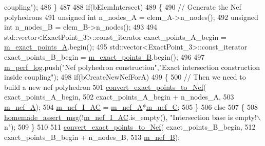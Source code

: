 \begin{DoxyCode}
{       coupling"});
486     \}
487 
488     \textcolor{keywordflow}{if}(bElemIntersect)
489     \{
490         \textcolor{comment}{// Generate the Nef polyhedrons}
491         \textcolor{keywordtype}{unsigned} \textcolor{keywordtype}{int} n\_nodes\_A = elem\_A->n\_nodes();
492         \textcolor{keywordtype}{unsigned} \textcolor{keywordtype}{int} n\_nodes\_B = elem\_B->n\_nodes();
493 
494         std::vector<ExactPoint\_3>::const\_iterator exact\_points\_A\_begin = 
      \hyperlink{classcarl_1_1_intersection___tools_ad636117b292272044b252be62124eb0a}{m\_exact\_points\_A}.begin();
495         std::vector<ExactPoint\_3>::const\_iterator exact\_points\_B\_begin = 
      \hyperlink{classcarl_1_1_intersection___tools_a2c3b6211dd1f9b0aa5f2ac8ffc383182}{m\_exact\_points\_B}.begin();
496 
497         \hyperlink{classcarl_1_1_intersection___tools_afe18e6ca5fd12bae08efb98f69c71a48}{m\_perf\_log}.push(\textcolor{stringliteral}{"Nef polyhedron construction"},\textcolor{stringliteral}{"Exact intersection construction inside
       coupling"});
498         \textcolor{keywordflow}{if}(bCreateNewNefForA)
499         \{
500             \textcolor{comment}{// Then we need to build a new nef polyhedron}
501             \hyperlink{classcarl_1_1_intersection___tools_af689c53cf00359c518234d8d070c4e53}{convert\_exact\_points\_to\_Nef}( exact\_points\_A\_begin,
502                                             exact\_points\_A\_begin + n\_nodes\_A,
503                                             \hyperlink{classcarl_1_1_intersection___tools_a66a33158af0779366d4109e96a10ddc4}{m\_nef\_A});
504             \hyperlink{classcarl_1_1_intersection___tools_a8333f16787459e65c4fe913dad50b5c6}{m\_nef\_I\_AC} = \hyperlink{classcarl_1_1_intersection___tools_a66a33158af0779366d4109e96a10ddc4}{m\_nef\_A}*\hyperlink{classcarl_1_1_intersection___tools_adf2892a8902442fbfebb913e9a4fb8ac}{m\_nef\_C};
505         \}
506         \textcolor{keywordflow}{else}
507         \{
508             \hyperlink{common__header_8h_a593ccc80b790b2268653fcf6597bf451}{homemade\_assert\_msg}(!\hyperlink{classcarl_1_1_intersection___tools_a8333f16787459e65c4fe913dad50b5c6}{m\_nef\_I\_AC}.is\_empty(), \textcolor{stringliteral}{"Intersection base is
       empty!\(\backslash\)n"});
509         \}
510 
511         \hyperlink{classcarl_1_1_intersection___tools_af689c53cf00359c518234d8d070c4e53}{convert\_exact\_points\_to\_Nef}( exact\_points\_B\_begin,
512                                         exact\_points\_B\_begin + n\_nodes\_B,
513                                         \hyperlink{classcarl_1_1_intersection___tools_a0b134a30452c8a767fc4265c7c0296a9}{m\_nef\_B});

\end{DoxyCode}
